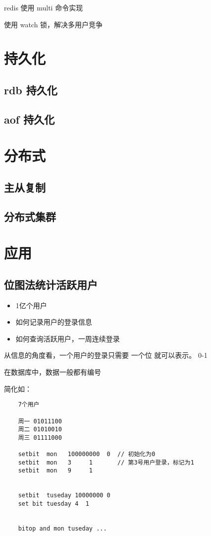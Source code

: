 \documentclass[UTF8,a4paper,12pt]{ctexbook}
\begin{document}
		redis 使用 multi  命令实现
		
		使用 watch 锁，解决多用户竞争

\chapter{持久化}	
	\section{rdb 持久化}
	
	
	\section{aof 持久化}
	

\chapter{分布式}	
	\section{主从复制}
	
	\section{分布式集群}

\chapter{应用}	
	\section{位图法统计活跃用户}
		\begin{itemize}
			\item 1亿个用户
			\item 如何记录用户的登录信息
			\item 如何查询活跃用户，一周连续登录
		\end{itemize}
	
		从信息的角度看，一个用户的登录只需要 一个位 就可以表示。 0-1
		
		在数据库中，数据一般都有编号
		
		简化如：
			\begin{lstlisting}
	7个用户
	
	周一 01011100
	周二 01010010
	周三 01111000
	
	setbit  mon   100000000  0  // 初始化为0
	setbit  mon   3     1       // 第3号用户登录，标记为1
	setbit  mon   9     1
	
	
	setbit  tuseday 10000000 0
	set bit tuesday 4  1
	

	bitop and mon tuseday ...
	
			\end{lstlisting}
\end{document}
